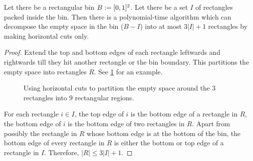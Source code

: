 \begin{lemma}
\label{lem:empty-to-rects}
Let there be a rectangular bin $B := [0, 1]^2$.
Let there be a set $I$ of rectangles packed inside the bin.
Then there is a polynomial-time algorithm which can decompose the empty space in the bin
($B - I$) into at most $3|I|+1$ rectangles by making horizontal cuts only.
\end{lemma}
\begin{proof}
Extend the top and bottom edges of each rectangle leftwards and rightwards
till they hit another rectangle or the bin boundary.
This partitions the empty space into rectangles $R$.
See \cref{fig:empty-space-to-rects} for an example.

\begin{figure}[htb]
\centering

\caption{Using horizontal cuts to partition the empty space
around the 3 rectangles into 9 rectangular regions.}
\label{fig:empty-space-to-rects}
\end{figure}

For each rectangle $i \in I$, the top edge of $i$ is the bottom edge of a rectangle in $R$,
the bottom edge of $i$ is the bottom edge of two rectangles in $R$.
Apart from possibly the rectangle in $R$ whose bottom edge is at the bottom of the bin,
the bottom edge of every rectangle in $R$ is either the bottom or top edge of a rectangle in $I$.
Therefore, $|R| \le 3|I| + 1$.
\end{proof}


